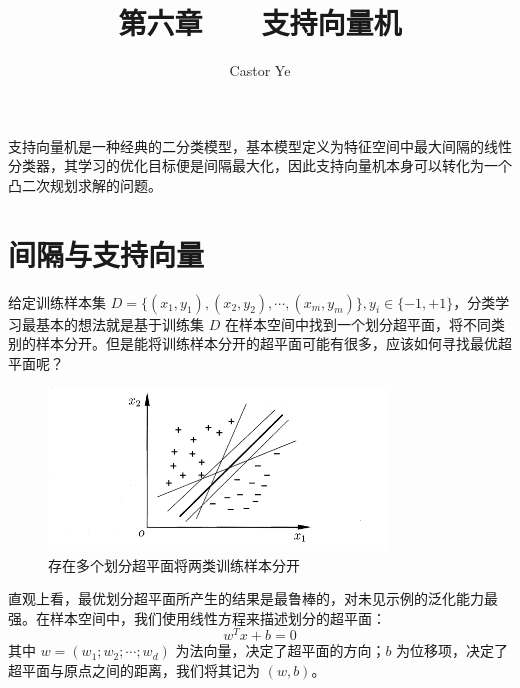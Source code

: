 \documentclass[12pt, a4paper]{article} %
\title{第六章 \ \ \ 支持向量机} %
\author{Castor Ye} %
\date{} %
\begin{document}
\maketitle %
\newtheorem{definition}{定义}[section]
\newtheorem{theorem}{定理}[section]
\newtheorem{example}{例}[section]
\newtheorem{solution}{题解}
\newtheorem{algorithm}{算法}
\newtheorem{axiom}{公理}
\newtheorem{property}{性质}
\newtheorem{proposition}{命题}
\newtheorem{lemma}{引理}
\newtheorem{corollary}{推论}[section]
\newtheorem{remark}{注解}
\newtheorem{condition}{条件}
\newtheorem{conclusion}{结论}
\newtheorem{assumption}{假设}
\renewcommand{\figurename}{图} %
\renewcommand{\tablename}{表} %

支持向量机是一种经典的二分类模型，基本模型定义为特征空间中最大间隔的线性分类器，其学习的优化目标便是间隔最大化，因此支持向量机本身可以转化为一个凸二次规划求解的问题。

\section{间隔与支持向量}

给定训练样本集 $D = \{(x_1, y_1), (x_2, y_2), \cdots, (x_m, y_m)\}, y_i \in \{-1, +1\}$，分类学习最基本的想法就是基于训练集 $D$ 在样本空间中找到一个划分超平面，将不同类别的样本分开。但是能将训练样本分开的超平面可能有很多，应该如何寻找最优超平面呢？

\begin{figure}[H]
    \centering
    \includegraphics[width=0.8\textwidth]{../img/6-1-存在多个划分超平面将两类训练样本分开.png}
    \caption{存在多个划分超平面将两类训练样本分开}
    \label{fig:存在多个划分超平面将两类训练样本分开}
\end{figure}

直观上看，最优划分超平面所产生的结果是最鲁棒的，对未见示例的泛化能力最强。在样本空间中，我们使用线性方程来描述划分的超平面：
\begin{equation*}
    w^T x + b = 0
\end{equation*}
其中 $w = (w_1;w_2;\cdots;w_d)$ 为法向量，决定了超平面的方向；$b$ 为位移项，决定了超平面与原点之间的距离，我们将其记为 $(w, b)$。
\end{document}
